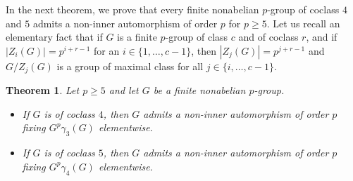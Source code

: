 \documentclass[preprint,sort&compress,12pt]{elsarticle}
\newtheorem{theorem}{Theorem}[section]
\theoremstyle{definition}
\numberwithin{equation}{theorem}
\begin{document}
In the next theorem, we prove that every finite nonabelian $p$-group of coclass $4$ and $5$ admits a non-inner automorphism of order $p$ for $p\ge 5$. Let us recall an elementary fact that if $G$ is a finite $p$-group of class $c$ and of coclass $r$, and if $|Z_i(G)|=p^{i+r-1}$ for an $i\in\{1, \ldots, c-1\}$, then $|Z_j(G)|=p^{j+r-1}$ and $G/Z_j(G)$ is a group of maximal class for all $j\in\{i, \ldots, c-1\}$. 

\begin{theorem}\label{th:5.4}
Let $p\ge 5$ and let $G$ be a finite nonabelian $p$-group.
\begin{itemize}
\item [$(i)$] If $G$ is of coclass $4$, then $G$ admits a non-inner automorphism of order $p$ fixing $G^p\gamma_3(G)$ elementwise.
\item [$(ii)$] If $G$ is of coclass $5$, then $G$ admits a non-inner automorphism of order $p$ fixing $G^p\gamma_4(G)$ elementwise.
\end{itemize}
\end{theorem}
\end{document}
